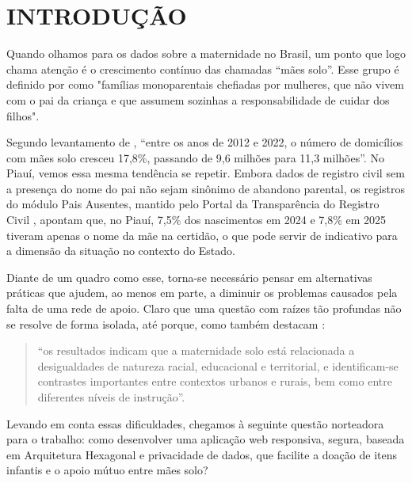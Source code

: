 \pagestyle{plain}

\section{INTRODUÇÃO}
Quando olhamos para os dados sobre a maternidade no Brasil, um ponto que logo chama atenção é o crescimento contínuo das chamadas “mães solo”. Esse grupo é definido por \textcite[2]{souza2024} como "famílias monoparentais chefiadas por mulheres, que não vivem com o pai da criança e que assumem sozinhas a responsabilidade de cuidar dos filhos". 

Segundo levantamento de \textcite{feijo2023}, “entre os anos de 2012 e 2022, o número de domicílios com mães solo cresceu 17,8\%, passando de 9,6 milhões para 11,3 milhões”. No Piauí, vemos essa mesma tendência se repetir. Embora dados de registro civil sem a presença do nome do pai não sejam sinônimo de abandono parental, os registros do módulo Pais Ausentes, mantido pelo Portal da Transparência do Registro Civil \cite{arpen2026}, apontam que, no Piauí, 7,5\% dos nascimentos em 2024 e 7,8\% em 2025 tiveram apenas o nome da mãe na certidão, o que pode servir de indicativo para a dimensão da situação no contexto do Estado.

Diante de um quadro como esse, torna-se necessário pensar em alternativas práticas que ajudem, ao menos em parte, a diminuir os problemas causados pela falta de uma rede de apoio. Claro que uma questão com raízes tão profundas não se resolve de forma isolada, até porque, como também destacam \textcite[1]{souza2024}:
\begin{quote}
“os resultados indicam que a maternidade solo está relacionada a desigualdades de natureza racial, educacional e territorial, e identificam-se contrastes importantes entre contextos urbanos e rurais, bem como entre diferentes níveis de instrução”.
\end{quote}

Levando em conta essas dificuldades, chegamos à seguinte questão norteadora para o trabalho: como desenvolver uma aplicação web responsiva, segura, baseada em Arquitetura Hexagonal e privacidade de dados, que facilite a doação de itens infantis e o apoio mútuo entre mães solo?
